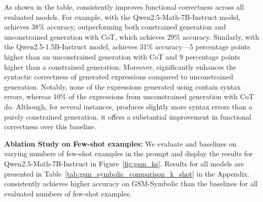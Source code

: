 As shown in the table, \Tool{} consistently improves functional correctness across all evaluated models. For example, with the Qwen2.5-Math-7B-Instruct model, \Tool{} achieves 38\% accuracy, outperforming both constrained generation and unconstrained generation with CoT, which achieves 29\% accuracy. Similarly, with the Qwen2.5-1.5B-Instruct model, \Tool{} achieves 31\% accuracy—5 percentage points higher than an unconstrained generation with CoT and 9 percentage points higher than a constrained generation. Moreover, \Tool{} significantly enhances the syntactic correctness of generated expressions compared to unconstrained generation. Notably, none of the expressions generated using \Tool{} contain syntax errors, whereas 10\% of the expressions from unconstrained generation with CoT do. Although, for several instances, \Tool{} produces slightly more syntax errors than a purely constrained generation, it offers a substantial improvement in functional correctness over this baseline.

\textbf{Ablation Study on Few-shot examples:}
We evaluate \Tool{} and baselines on varying numbers of few-shot examples in the prompt and display the results for Qwen2.5-Math-7B-Instruct in Figure~\ref{fig:gsm_ks}.
Results for all models are presented in Table~\ref{tab:gsm_symbolic_comparison_k_shot} in the Appendix. \Tool{} consistently achieves higher accuracy on GSM-Symbolic than the baselines for all evaluated numbers of few-shot examples.


